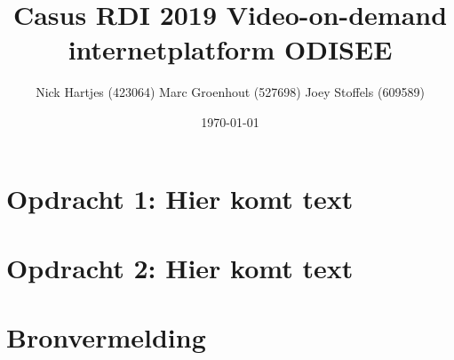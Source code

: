\documentclass{template/han}
\title{
Casus RDI 2019 \newline
\large Video-on-demand internetplatform ODISEE
}
\author{
Nick Hartjes (423064) \newline
Marc Groenhout (527698) \newline
Joey Stoffels (609589)
}
\date{\today}
\begin{document}
    \newpage
    \maketitle

    \newpage
    \tableofcontents

    \newpage
    \section{Opdracht 1: Hier komt text}
    \label{opdracht1}
    
    \clearpage
    
    \clearpage

    \section{Opdracht 2: Hier komt text}
    \label{opdracht2}
    
    \clearpage
    
    \clearpage

    \newpage
    \section{Bronvermelding}
    \label{bronvermelding}

    \nocite{*}
    \printbibliography[heading=none]
    
\end{document}
